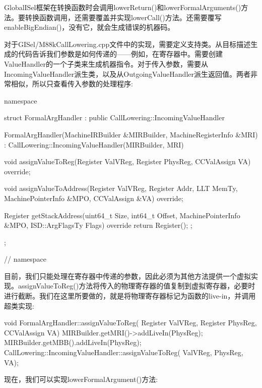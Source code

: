 GlobalISel框架在转换函数时会调用lowerReturn()和lowerFormalArguments()方法。要转换函数调用，还需要覆盖并实现lowerCall()方法。还需要覆写enableBigEndian()，没有它，就会生成错误的机器码。

对于GISel/M88kCallLowering.cpp文件中的实现，需要定义支持类。从目标描述生成的代码告诉我们参数是如何传递的——例如，在寄存器中。需要创建ValueHandler的一个子类来生成机器指令。对于传入参数，需要从IncomingValueHandler派生类，以及从OutgoingValueHandler派生返回值。两者非常相似，所以只查看传入参数的处理程序:

\begin{cpp}
namespace {
struct FormalArgHandler
        : public CallLowering::IncomingValueHandler {
    FormalArgHandler(MachineIRBuilder &MIRBuilder,
                     MachineRegisterInfo &MRI)
        : CallLowering::IncomingValueHandler(MIRBuilder,
                                             MRI) {}

    void assignValueToReg(Register ValVReg,
                          Register PhysReg,
                          CCValAssign VA) override;

    void assignValueToAddress(Register ValVReg,
                              Register Addr, LLT MemTy,
                              MachinePointerInfo &MPO,
                              CCValAssign &VA) override{};

    Register
    getStackAddress(uint64_t Size, int64_t Offset,
                    MachinePointerInfo &MPO,
                    ISD::ArgFlagsTy Flags) override {
        return Register();
    };
};
} // namespace
\end{cpp}

目前，我们只能处理在寄存器中传递的参数，因此必须为其他方法提供一个虚拟实现。assignValueToReg()方法将传入的物理寄存器的值复制到虚拟寄存器，必要时进行截断。我们在这里所要做的，就是将物理寄存器标记为函数的live-in，并调用超类实现:

\begin{cpp}
void FormalArgHandler::assignValueToReg(
        Register ValVReg, Register PhysReg,
        CCValAssign VA) {
    MIRBuilder.getMRI()->addLiveIn(PhysReg);
    MIRBuilder.getMBB().addLiveIn(PhysReg);
    CallLowering::IncomingValueHandler::assignValueToReg(
        ValVReg, PhysReg, VA);
}
\end{cpp}

现在，我们可以实现lowerFormalArgument()方法:

